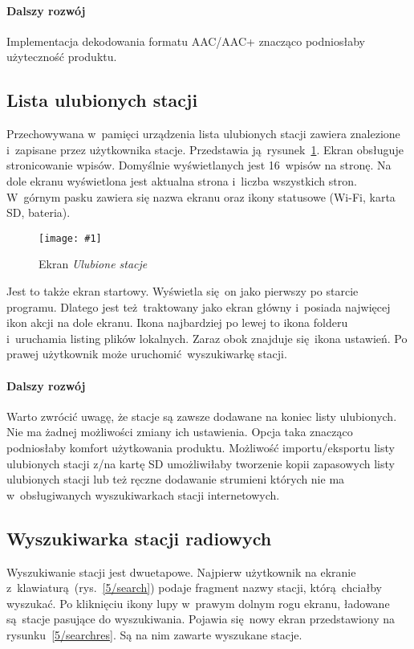 \documentclass[polish]{aghengthesis}
\newcommand{\imgint}[4]{
	\begin{figure}[{#4}]
		\centering
		\texttt{[image: \#1]}
		\caption{#2}
		\label{#1}
	\end{figure}
}
\newcommand{\imgh}[3]{\imgint{#1}{#2}{#3}{H}}
\begin{document}
			\paragraph{Dalszy rozwój}
				Implementacja dekodowania formatu AAC/AAC+ znacząco podniosłaby użyteczność produktu.
			
		\subsection{Lista ulubionych stacji}
			Przechowywana w~pamięci urządzenia lista ulubionych stacji zawiera znalezione i~zapisane przez użytkownika stacje. Przedstawia ją rysunek~\ref{5/fav}.
			Ekran obsługuje stronicowanie wpisów. Domyślnie wyświetlanych jest 16~wpisów na stronę. Na dole ekranu wyświetlona jest aktualna strona i~liczba wszystkich stron.
			W~górnym pasku zawiera się nazwa ekranu oraz ikony statusowe (Wi-Fi, karta SD, bateria).
			
			\imgh{5/fav}{Ekran \textit{Ulubione stacje}}{0.5}
			
			Jest to także ekran startowy. Wyświetla się on jako pierwszy po starcie programu. Dlatego jest też traktowany jako ekran główny i~posiada najwięcej ikon akcji na dole ekranu.
			Ikona najbardziej po lewej to ikona folderu i~uruchamia listing plików lokalnych. Zaraz obok znajduje się ikona ustawień. Po prawej użytkownik może uruchomić wyszukiwarkę stacji.
			
			\paragraph{Dalszy rozwój}
				Warto zwrócić uwagę, że stacje są zawsze dodawane na koniec listy ulubionych. Nie ma żadnej możliwości zmiany ich ustawienia. Opcja taka znacząco podniosłaby komfort użytkowania produktu. Możliwość importu/eksportu listy ulubionych stacji z/na kartę SD umożliwiłaby tworzenie kopii zapasowych listy ulubionych stacji lub też ręczne dodawanie strumieni których nie ma w~obsługiwanych wyszukiwarkach stacji internetowych.
			
		\subsection{Wyszukiwarka stacji radiowych}
			Wyszukiwanie stacji jest dwuetapowe. Najpierw użytkownik na ekranie z~klawiaturą (rys.~\ref{5/search}) podaje fragment nazwy stacji, którą chciałby wyszukać. Po kliknięciu ikony lupy w~prawym dolnym rogu ekranu, ładowane są stacje pasujące do wyszukiwania. Pojawia się nowy ekran przedstawiony na rysunku~\ref{5/searchres}. Są na nim zawarte wyszukane stacje.
			
\end{document}
